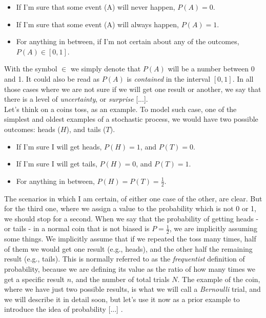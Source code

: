 \documentclass{book}
\begin{document}
\begin{itemize}
\item If I'm sure that some event (A) will never happen, $P(A) = 0$.
\item If I'm sure that some event (A) will always happen,  $P(A) = 1$.
\item For anything in between, if I'm not certain about any of the outcomes, $P(A) \in [0, 1]$.
\end{itemize}

With the symbol $ \in$ we simply denote that $P(A)$ will be a number between 0 and 1. It could also be read as $P(A)$ is \textit{contained} in the interval $[0, 1]$. In all those cases where we are not sure if we will get one result or another, we say that there is a level of \textit{uncertainty}, or \textit{surprise} [...].\\

Let's think on a coins toss, as an example. To model such case, one of the simplest and oldest examples of a stochastic process, we would have two possible outcomes: heads ($H$), and tails ($T$).

\begin{itemize}
\item If I'm sure I will get heads, $P(H) = 1$, and $P(T) = 0$.
\item If I'm sure I will get tails, $P(H) = 0$, and $P(T) = 1$.
\item For anything in between, $P(H) = P(T) = \frac{1}{2}$.
\end{itemize}

The scenarios in which I am certain, of either one case of the other, are clear. But for the third one, where we assign a value to the probability which is not 0 or 1, we should stop for a second. When we say that the probability of getting heads - or tails - in a normal coin that is not biased is $P = \frac{1}{2}$, we are implicitly assuming some things. We implicitly assume that if we repeated the toss many times, half of them we would get one result (e.g., heads), and the other half the remaining result (e.g., tails). This is normally referred to as the \textit{frequentist} definition of probability, because we are defining its value as the ratio of how many times we get a specific result $n$, and the number of total trials $N$. The example of the coin, where we have just two possible results, is what we will call a \textit{Bernoulli} trial, and we will describe it in detail soon, but let's use it now as a prior example to introduce the idea of probability [...] .\\
\end{document}

